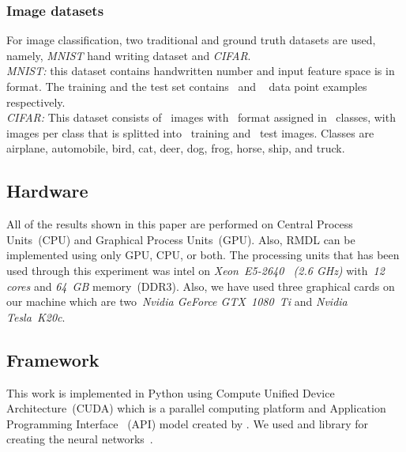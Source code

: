 \documentclass[sigconf, final]{acmart}
\begin{document}
\subsubsection{Image datasets}
For image classification, two traditional and ground truth datasets are used, namely, \textit{MNIST} hand writing dataset and \textit{CIFAR}.\\\textit{MNIST:} this dataset contains handwritten number  and input feature space is in~ format. The training and the test set contains~ and ~ data point examples respectively.\\ \textit{CIFAR:} This dataset consists of~ images with~ format assigned in~ classes, with~ images per class that is splitted into~ training and~ test images. Classes are airplane, automobile, bird, cat, deer, dog, frog, horse, ship, and truck.



\subsection{Hardware}
All of the results shown in this paper are performed on Central Process Units~(CPU) and Graphical Process Units~(GPU). Also, RMDL can be implemented using only GPU, CPU, or both. The processing units that has been used through this experiment was intel on \textit{Xeon~E5-2640~ (2.6 GHz)} with~\textit{12 cores} and \textit{64~GB} memory~(DDR3). Also, we have used three graphical cards on our machine which are two~\textit{Nvidia GeForce GTX~1080~Ti} and \textit{Nvidia Tesla~K20c}.
\subsection{Framework}
This work is implemented in Python using Compute Unified Device Architecture~(CUDA) which is a parallel computing platform and Application Programming Interface ~(API) model created by . We used  and  library for creating the neural networks~\cite{abadi2016tensorflow,chollet2015keras}. 
\end{document}
